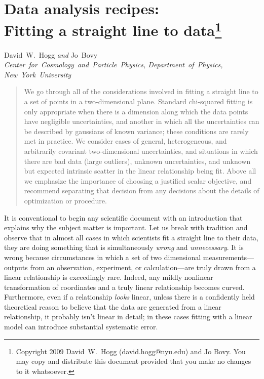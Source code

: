 \documentclass[12pt,twoside]{article}
\begin{document}
\thispagestyle{plain}\raggedbottom
\section*{Data analysis recipes:\ \\
  Fitting a straight line to data\footnote{
    Copyright 2009 David~W.~Hogg (david.hogg@nyu.edu) and Jo Bovy.
    You may copy and distribute this document
    provided that you make no changes to it whatsoever.}}

\noindent
David~W.~Hogg \textsl{and}
Jo~Bovy\\
\textsl{Center~for~Cosmology~and~Particle~Physics, Department~of~Physics,\\
New~York~University}

\begin{abstract}
  We go through all of the considerations involved in fitting a
  straight line to a set of points in a two-dimensional plane.
  Standard chi-squared fitting is only appropriate when there is a
  dimension along which the data points have negligible uncertainties,
  and another in which all the uncertainties can be described by
  gaussians of known variance; these conditions are rarely met in
  practice.  We consider cases of general, heterogeneous, and
  arbitrarily covariant two-dimensional uncertainties, and situations
  in which there are bad data (large outliers), unknown uncertainties,
  and unknown but expected intrinsic scatter in the linear
  relationship being fit.  Above all we emphasize the importance of
  choosing a justified scalar objective, and recommend separating that
  decision from any decisions about the details of optimization or
  procedure.
\end{abstract}

It is conventional to begin any scientific document with an
introduction that explains why the subject matter is important.  Let
us break with tradition and observe that in almost all cases in which
scientists fit a straight line to their data, they are doing something
that is simultaneously \emph{wrong} and \emph{unnecessary}.  It is
wrong because circumstances in which a set of two dimensional
measurements---outputs from an observation, experiment, or
calculation---are truly drawn from a linear relationship is
exceedingly rare.  Indeed, any mildly nonlinear transformation of
coordinates and a truly linear relationship becomes curved.
Furthermore, even if a relationship \emph{looks} linear, unless there
is a confidently held theoretical reason to believe that the data are
generated from a linear relationship, it probably isn't linear in
detail; in these cases fitting with a linear model can introduce
substantial systematic error.
\end{document}
